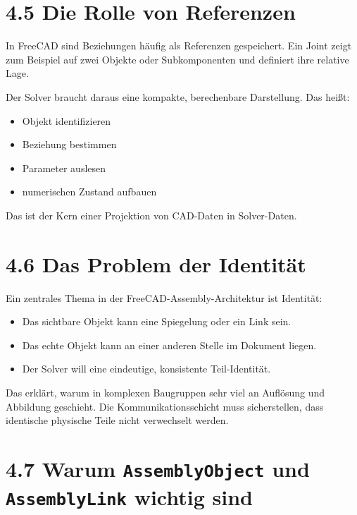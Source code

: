 \documentclass[
  12pt
]{book}
\providecommand{\tightlist}{%
  \setlength{\itemsep}{0pt}\setlength{\parskip}{0pt}}
\begin{document}
\hypertarget{die-rolle-von-referenzen}{%
\section{\texorpdfstring{{4.5} Die Rolle von
Referenzen}{4.5 Die Rolle von Referenzen}}\label{die-rolle-von-referenzen}}

In FreeCAD sind Beziehungen häufig als Referenzen gespeichert. Ein Joint
zeigt zum Beispiel auf zwei Objekte oder Subkomponenten und definiert
ihre relative Lage.

Der Solver braucht daraus eine kompakte, berechenbare Darstellung. Das
heißt:

\begin{itemize}
\tightlist
\item
  Objekt identifizieren
\item
  Beziehung bestimmen
\item
  Parameter auslesen
\item
  numerischen Zustand aufbauen
\end{itemize}

Das ist der Kern einer Projektion von CAD-Daten in Solver-Daten.

\hypertarget{das-problem-der-identituxe4t}{%
\section{\texorpdfstring{{4.6} Das Problem der
Identität}{4.6 Das Problem der Identität}}\label{das-problem-der-identituxe4t}}

Ein zentrales Thema in der FreeCAD-Assembly-Architektur ist Identität:

\begin{itemize}
\tightlist
\item
  Das sichtbare Objekt kann eine Spiegelung oder ein Link sein.
\item
  Das echte Objekt kann an einer anderen Stelle im Dokument liegen.
\item
  Der Solver will eine eindeutige, konsistente Teil-Identität.
\end{itemize}

Das erklärt, warum in komplexen Baugruppen sehr viel an Auflösung und
Abbildung geschieht. Die Kommunikationsschicht muss sicherstellen, dass
identische physische Teile nicht verwechselt werden.

\hypertarget{warum-assemblyobject-und-assemblylink-wichtig-sind}{%
\section{\texorpdfstring{{4.7} Warum \texttt{AssemblyObject} und
\texttt{AssemblyLink} wichtig
sind}{4.7 Warum AssemblyObject und AssemblyLink wichtig sind}}\label{warum-assemblyobject-und-assemblylink-wichtig-sind}}
\end{document}
